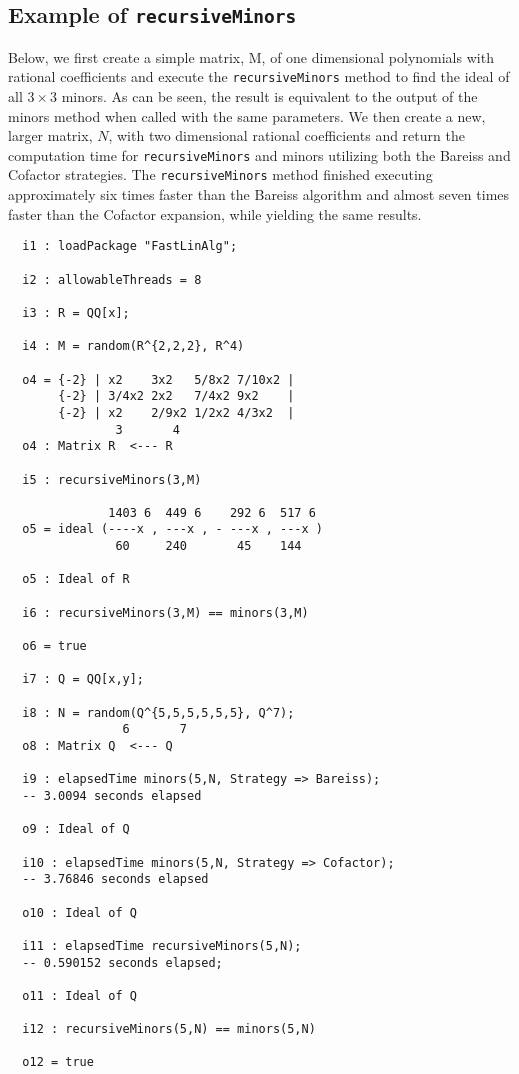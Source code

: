 \documentclass[11pt]{amsart}
\begin{document}
\subsection{Example of {\tt recursiveMinors}}
\par Below, we first create a simple matrix, M, of one dimensional polynomials with 
rational coefficients and execute the {\tt recursiveMinors} method to find the ideal of all 
$3 \times 3$ minors. As can be seen, the result is equivalent to the output of the minors method 
when called with the same parameters. We then create a new, larger matrix, $N$, with two
dimensional rational coefficients and return the computation time for {\tt recursiveMinors} and 
minors utilizing both the Bareiss and Cofactor strategies. The {\tt recursiveMinors} method 
finished executing approximately six times faster than the Bareiss algorithm and almost seven
times faster than the Cofactor expansion, while yielding the same results. 

{\small\color{blue}
\begin{verbatim}
  i1 : loadPackage "FastLinAlg";

  i2 : allowableThreads = 8

  i3 : R = QQ[x];

  i4 : M = random(R^{2,2,2}, R^4)

  o4 = {-2} | x2    3x2   5/8x2 7/10x2 |
       {-2} | 3/4x2 2x2   7/4x2 9x2    |
       {-2} | x2    2/9x2 1/2x2 4/3x2  |
               3       4
  o4 : Matrix R  <--- R
  
  i5 : recursiveMinors(3,M)

              1403 6  449 6    292 6  517 6
  o5 = ideal (----x , ---x , - ---x , ---x )
               60     240       45    144
  
  o5 : Ideal of R
  
  i6 : recursiveMinors(3,M) == minors(3,M)
  
  o6 = true
  
  i7 : Q = QQ[x,y];

  i8 : N = random(Q^{5,5,5,5,5,5}, Q^7);
                6       7
  o8 : Matrix Q  <--- Q

  i9 : elapsedTime minors(5,N, Strategy => Bareiss);
  -- 3.0094 seconds elapsed
  
  o9 : Ideal of Q
  
  i10 : elapsedTime minors(5,N, Strategy => Cofactor);
  -- 3.76846 seconds elapsed
  
  o10 : Ideal of Q
  
  i11 : elapsedTime recursiveMinors(5,N);
  -- 0.590152 seconds elapsed;
  
  o11 : Ideal of Q
  
  i12 : recursiveMinors(5,N) == minors(5,N)
  
  o12 = true

\end{verbatim}
}




\end{document}
